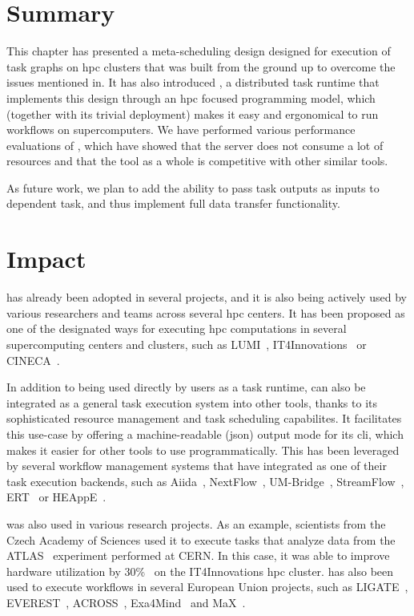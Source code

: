 \section*{Summary}
This chapter has presented a meta-scheduling design designed for execution of task graphs on
\gls{hpc} clusters that was built from the ground up to overcome the issues mentioned
in. It has also introduced \hyperqueue{}, a distributed task
runtime that implements this design through an \gls{hpc} focused programming model,
which (together with its trivial deployment) makes it easy and ergonomical to run workflows on
supercomputers.  We have performed various performance evaluations%
of \hyperqueue{}, which have showed that the server does not consume a lot of resources
and that the tool as a whole is competitive with other similar tools.


As future work, we plan to add the ability to pass task outputs as inputs to dependent task, and
thus implement full data transfer functionality.

\section*{Impact}
\hyperqueue{} has already been adopted in several projects, and it is also being actively
used by various researchers and teams across several \gls{hpc} centers. It has been
proposed as one of the designated ways for executing \gls{hpc} computations in
several supercomputing centers and clusters, such as LUMI~\cite{it4i-lumi},
IT4Innovations~\cite{it4i-hq} or CINECA~\cite{cineca}.

In addition to being used directly by users as a task runtime, \hyperqueue{} can also be
integrated as a general task execution system into other tools, thanks to its sophisticated
resource management and task scheduling capabilites. It facilitates this use-case by offering a
machine-readable (\gls{json}) output mode for its \gls{cli}, which makes
it easier for other tools to use \hyperqueue{} programmatically. This has been leveraged
by several workflow management systems that have integrated \hyperqueue{} as one of their
task execution backends, such as Aiida~\cite{aiida-hq}, NextFlow~\cite{nextflow-hq},
UM-Bridge~\cite{umbridge}, StreamFlow~\cite{streamflow-hq}, ERT~\cite{ert}
or HEAppE~\cite{heappe}.

\hyperqueue{} was also used in various research projects. As an example,
scientists from the Czech Academy of Sciences used it to execute tasks that analyze data from the
ATLAS~\cite{atlas} experiment performed at CERN. In this case, it was able to improve
hardware utilization by 30\%~\cite{cern-hq} on the IT4Innovations \gls{hpc}
cluster. \hyperqueue{} has also been used to execute workflows in several European Union
projects, such as LIGATE~\cite{ligate}, EVEREST~\cite{everest},
ACROSS~\cite{across}, Exa4Mind~\cite{exa4mind} and MaX~\cite{max}.

